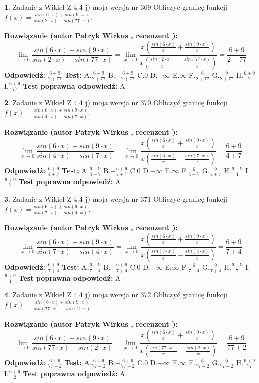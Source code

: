 \documentclass[12pt, a4paper]{article}
\theoremstyle{definition} %
\newtheorem{zad}{}
\newcommand{\zadStart}[1]{\begin{zad}#1\newline}
\newcommand{\zadStop}{\end{zad}}
\newcommand{\rozwStart}[2]{\noindent \textbf{Rozwiązanie (autor #1 , recenzent #2): }\newline}
\newcommand{\rozwStop}{\newline}
\newcommand{\odpStart}{\noindent \textbf{Odpowiedź:}\newline}
\newcommand{\odpStop}{\newline}
\newcommand{\testStart}{\noindent \textbf{Test:}\newline}
\newcommand{\testStop}{\newline}
\newcommand{\kluczStart}{\noindent \textbf{Test poprawna odpowiedź:}\newline}
\newcommand{\kluczStop}{\newline}
\begin{document}
\zadStart{Zadanie z Wikieł Z 4.4 j) moja wersja nr 369}
Obliczyć granicę funkcji $f(x)=\frac{sin(6\cdot x) +sin(9\cdot x)}{sin(2\cdot x) -sin(77\cdot x)}$.
\zadStop
\rozwStart{Patryk Wirkus}{}
$$\lim\limits_{x\to 0}\frac{sin(6\cdot x) +sin(9\cdot x)}{sin(2\cdot x) -sin(77\cdot x)}=\lim\limits_{x\to 0}\frac{x(\frac{sin(6\cdot x)}{x}+\frac{sin(9\cdot x)}{x})}{x(\frac{sin(2\cdot x)}{x}-\frac{sin(77\cdot x)}{x})}=\frac{6+9}{2+77}$$
\rozwStop
\odpStart
$\frac{6+9}{2+77}$
\odpStop
\testStart
A.$\frac{6+9}{2+77}$
B.$-\frac{6+9}{2+77}$
C.$0$
D.$-\infty$
E.$\infty$
F.$\frac{6}{2+77}$
G.$\frac{9}{2+77}$
H.$\frac{6+9}{2}$
I.$\frac{6+9}{77}$
\testStop
\kluczStart
A
\kluczStop



\zadStart{Zadanie z Wikieł Z 4.4 j) moja wersja nr 370}
Obliczyć granicę funkcji $f(x)=\frac{sin(6\cdot x) +sin(9\cdot x)}{sin(4\cdot x) -sin(7\cdot x)}$.
\zadStop
\rozwStart{Patryk Wirkus}{}
$$\lim\limits_{x\to 0}\frac{sin(6\cdot x) +sin(9\cdot x)}{sin(4\cdot x) -sin(7\cdot x)}=\lim\limits_{x\to 0}\frac{x(\frac{sin(6\cdot x)}{x}+\frac{sin(9\cdot x)}{x})}{x(\frac{sin(4\cdot x)}{x}-\frac{sin(7\cdot x)}{x})}=\frac{6+9}{4+7}$$
\rozwStop
\odpStart
$\frac{6+9}{4+7}$
\odpStop
\testStart
A.$\frac{6+9}{4+7}$
B.$-\frac{6+9}{4+7}$
C.$0$
D.$-\infty$
E.$\infty$
F.$\frac{6}{4+7}$
G.$\frac{9}{4+7}$
H.$\frac{6+9}{4}$
I.$\frac{6+9}{7}$
\testStop
\kluczStart
A
\kluczStop



\zadStart{Zadanie z Wikieł Z 4.4 j) moja wersja nr 371}
Obliczyć granicę funkcji $f(x)=\frac{sin(6\cdot x) +sin(9\cdot x)}{sin(7\cdot x) -sin(4\cdot x)}$.
\zadStop
\rozwStart{Patryk Wirkus}{}
$$\lim\limits_{x\to 0}\frac{sin(6\cdot x) +sin(9\cdot x)}{sin(7\cdot x) -sin(4\cdot x)}=\lim\limits_{x\to 0}\frac{x(\frac{sin(6\cdot x)}{x}+\frac{sin(9\cdot x)}{x})}{x(\frac{sin(7\cdot x)}{x}-\frac{sin(4\cdot x)}{x})}=\frac{6+9}{7+4}$$
\rozwStop
\odpStart
$\frac{6+9}{7+4}$
\odpStop
\testStart
A.$\frac{6+9}{7+4}$
B.$-\frac{6+9}{7+4}$
C.$0$
D.$-\infty$
E.$\infty$
F.$\frac{6}{7+4}$
G.$\frac{9}{7+4}$
H.$\frac{6+9}{7}$
I.$\frac{6+9}{4}$
\testStop
\kluczStart
A
\kluczStop



\zadStart{Zadanie z Wikieł Z 4.4 j) moja wersja nr 372}
Obliczyć granicę funkcji $f(x)=\frac{sin(6\cdot x) +sin(9\cdot x)}{sin(77\cdot x) -sin(2\cdot x)}$.
\zadStop
\rozwStart{Patryk Wirkus}{}
$$\lim\limits_{x\to 0}\frac{sin(6\cdot x) +sin(9\cdot x)}{sin(77\cdot x) -sin(2\cdot x)}=\lim\limits_{x\to 0}\frac{x(\frac{sin(6\cdot x)}{x}+\frac{sin(9\cdot x)}{x})}{x(\frac{sin(77\cdot x)}{x}-\frac{sin(2\cdot x)}{x})}=\frac{6+9}{77+2}$$
\rozwStop
\odpStart
$\frac{6+9}{77+2}$
\odpStop
\testStart
A.$\frac{6+9}{77+2}$
B.$-\frac{6+9}{77+2}$
C.$0$
D.$-\infty$
E.$\infty$
F.$\frac{6}{77+2}$
G.$\frac{9}{77+2}$
H.$\frac{6+9}{77}$
I.$\frac{6+9}{2}$
\testStop
\kluczStart
A
\kluczStop
\end{document}

